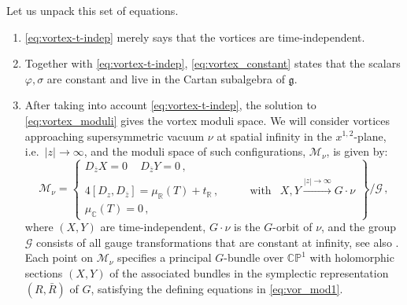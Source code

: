 \documentclass[12pt,a4paper]{article}
\renewcommand{\(}{\left(}
\renewcommand{\)}{\right)}
\renewcommand{\(}{\left(}
\renewcommand{\)}{\right)}
\begin{document}
Let us unpack this set of equations. 
\begin{enumerate}
\item \eqref{eq:vortex-t-indep} merely says that the vortices are time-independent.
\item Together with \eqref{eq:vortex-t-indep},  \eqref{eq:vortex_constant} states that the scalars $\varphi,\sigma$ are constant and live in the Cartan subalgebra of $\mathfrak{g}$.

\item After taking into account \eqref{eq:vortex-t-indep}, the solution to \eqref{eq:vortex_moduli} gives the  vortex moduli space. 
We will consider vortices approaching supersymmetric vacuum $\nu$ at spatial infinity in the $x^{1,2}$-plane, i.e.\ $|z|\to\infty$, and the moduli space of such configurations, $\mathcal{M}_\nu$, is given by:
\begin{equation}\label{eq:vor_mod1}
\mathcal{M}_\nu=\left\{
\begin{array}{lcc}
D_{\bar{z}}X=0\, \quad D_{\bar{z}}Y=0\,,& &  \\
4[D_z,D_{\bar{z}}]=\mu_{\mathbb{R}}(T)+t_{\mathbb{R}}\,,&\qquad\mathrm{with}&X,Y\overset{|z|\to\infty}{\longrightarrow}G\cdot\nu \\
\mu_{\mathbb{C}}(T)=0\,,& &
\end{array}
\right\}/\mathcal{G}\,,
\end{equation}
where $(X,Y)$ are time-independent, $G\cdot \nu$ is the $G$-orbit of $\nu$, and
the group $\mathcal{G}$ consists of all gauge transformations that are constant at infinity, see also \cite{Bullimore:2016hdc}.
Each point on $\mathcal{M}_\nu$ specifies a principal $G$-bundle over $\mathbb{CP}^1$ 
with holomorphic sections $(X,Y)$ of the associated bundles in the symplectic representation $(R,\bar{R})$ of $G$, satisfying the defining equations in \eqref{eq:vor_mod1}.
	
\medskip
	

\end{enumerate}
\end{document}
